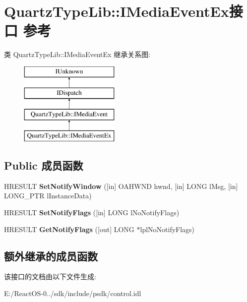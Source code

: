 \hypertarget{interface_quartz_type_lib_1_1_i_media_event_ex}{}\section{Quartz\+Type\+Lib\+:\+:I\+Media\+Event\+Ex接口 参考}
\label{interface_quartz_type_lib_1_1_i_media_event_ex}
类 Quartz\+Type\+Lib\+:\+:I\+Media\+Event\+Ex 继承关系图\+:\begin{figure}[H]
\begin{center}
\leavevmode
\includegraphics[height=4.000000cm]{interface_quartz_type_lib_1_1_i_media_event_ex}
\end{center}
\end{figure}
\subsection*{Public 成员函数}
\begin{DoxyCompactItemize}
\item 
\mbox{\label{interface_quartz_type_lib_1_1_i_media_event_ex_abb639f7fb3fa5bcc4e491497a14cb9cb}} 
H\+R\+E\+S\+U\+LT {\bfseries Set\+Notify\+Window} (\mbox{[}in\mbox{]} O\+A\+H\+W\+ND hwnd, \mbox{[}in\mbox{]} L\+O\+NG l\+Msg, \mbox{[}in\mbox{]} L\+O\+N\+G\+\_\+\+P\+TR l\+Instance\+Data)
\item 
\mbox{\label{interface_quartz_type_lib_1_1_i_media_event_ex_aa70052e7ba9d958578f2c7f1ba401dac}} 
H\+R\+E\+S\+U\+LT {\bfseries Set\+Notify\+Flags} (\mbox{[}in\mbox{]} L\+O\+NG l\+No\+Notify\+Flags)
\item 
\mbox{\label{interface_quartz_type_lib_1_1_i_media_event_ex_a9f122068cd9b169cf7475442993949bc}} 
H\+R\+E\+S\+U\+LT {\bfseries Get\+Notify\+Flags} (\mbox{[}out\mbox{]} L\+O\+NG $\ast$lpl\+No\+Notify\+Flags)
\end{DoxyCompactItemize}
\subsection*{额外继承的成员函数}


该接口的文档由以下文件生成\+:\begin{DoxyCompactItemize}
\item 
E\+:/\+React\+O\+S-\/0../sdk/include/psdk/control.\+idl\end{DoxyCompactItemize}
